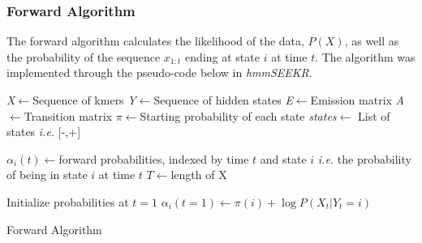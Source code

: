 \subsubsection{Forward Algorithm}
The forward algorithm calculates the likelihood of the data, $P(X)$, as well as the probability of the sequence $x_{1:t}$ ending at state $i$ at time $t$. The algorithm was implemented through the pseudo-code below in \emph{hmmSEEKR}. \\
\begin{algorithm}[h]
\DontPrintSemicolon
{}
\SetAlgoLined
\emph{X}$\leftarrow$Sequence of kmers\;
\emph{Y}$\leftarrow$Sequence of hidden states\;
\emph{E}$\leftarrow$Emission matrix\;
\emph{A}$\leftarrow$Transition matrix\;
\emph{$\pi$}$\leftarrow$Starting probability of each state\;
\emph{states}$\leftarrow$ List of states \emph{i.e.} [-,+]\;
\;

$\alpha_i(t)\leftarrow$forward probabilities, indexed by time $t$ and state $i$ \emph{i.e.} the probability of being in state $i$ at time $t$\;
$T\leftarrow$length of X\;\; 

Initialize probabilities at $t=1$\;
$\alpha_i(t=1)\leftarrow \pi(i) + \log P(X_t |Y_t = i)$\;\;
 \caption{Forward Algorithm}
 \label{alg:fwd}
\end{algorithm}
\clearpage

